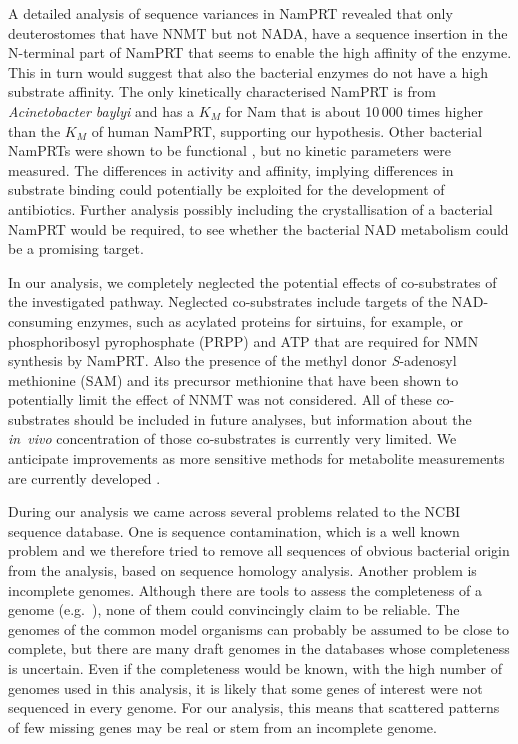 A detailed analysis of sequence variances in NamPRT revealed that only deuterostomes that have NNMT but not NADA, have a sequence insertion in the N-terminal part of NamPRT that seems to enable the high affinity of the enzyme. This in turn would suggest that also the bacterial enzymes do not have a high substrate affinity. The only kinetically characterised NamPRT is from \textit{Acinetobacter baylyi} \cite{Sorci2010} and has a $K_{M}$ for Nam that is about 10\,000 times higher than the $K_{M}$ of human NamPRT, supporting our hypothesis. Other bacterial NamPRTs were shown to be functional \cite{Martin2001,Gerdes2006}, but no kinetic parameters were measured. The differences in activity and affinity, implying differences in substrate binding could potentially be exploited for the development of antibiotics. Further analysis possibly including the crystallisation of a bacterial NamPRT would be required, to see whether the bacterial NAD metabolism could be a promising target.


In our analysis, we completely neglected the potential effects of co-substrates of the investigated pathway. Neglected co-substrates include targets of the NAD-consuming enzymes, such as acylated proteins for sirtuins, for example, or phosphoribosyl pyrophosphate (PRPP) and ATP that are required for NMN synthesis by NamPRT. Also the presence of the methyl donor \textit{S}-adenosyl methionine (SAM) and its precursor methionine that have been shown to potentially limit the effect of NNMT \cite{Ulanovskaya2013} was not considered. All of these co-substrates should be included in future analyses, but information about the \textit{in~vivo} concentration of those co-substrates is currently very limited. We anticipate improvements as more sensitive methods for metabolite measurements are currently developed .


During our analysis we came across several problems related to the NCBI sequence database. One is sequence contamination, which is a well known problem  and we therefore tried to remove all sequences of obvious bacterial origin from the analysis, based on sequence homology analysis. Another problem is incomplete genomes. Although there are tools to assess the completeness of a genome (e.g.~\cite{Simao2015}), none of them could convincingly claim to be reliable. The genomes of the common model organisms can probably be assumed to be close to complete, but there are many draft genomes in the databases whose completeness is uncertain. Even if the completeness would be known, with the high number of genomes used in this analysis, it is likely that some genes of interest were not sequenced in every genome. For our analysis, this means that scattered patterns of few missing genes may be real or stem from an incomplete genome.

